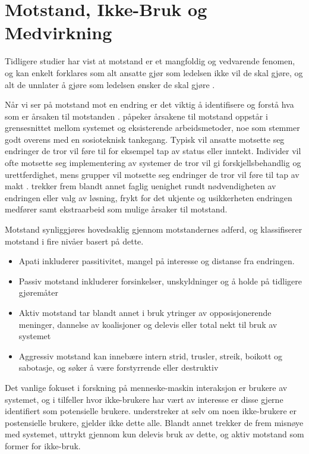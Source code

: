 \section{Motstand, Ikke-Bruk og Medvirkning}
\label{sec:motstand}

Tidligere studier har vist at motstand er et mangfoldig og vedvarende fenomen, og kan enkelt forklares som alt ansatte gjør som ledelsen ikke vil de skal gjøre, og alt de unnlater å gjøre som ledelsen ønsker de skal gjøre \citep{Timmons03}. 

\noindent
Når vi ser på motstand mot en endring er det viktig å identifisere og forstå hva som er årsaken til motstanden \citep{Lapointe05}. \citet{Timmons03} påpeker årsakene til motstand oppstår i grensesnittet mellom systemet og eksisterende arbeidsmetoder, noe som stemmer godt overens med en sosioteknisk tankegang. Typisk vil ansatte motsette seg endringer de tror vil føre til for eksempel tap av status eller inntekt. Individer vil ofte motsette seg implementering av systemer de tror vil gi forskjellsbehandlig og urettferdighet, mens grupper vil motsette seg endringer de tror vil føre til tap av makt \citep{Lapointe05}. \citet{Jacobsen12} trekker frem blandt annet faglig uenighet rundt nødvendigheten av endringen eller valg av løsning, frykt for det ukjente og usikkerheten endringen medfører samt ekstraarbeid som mulige årsaker til motstand.

\noindent
Motstand synliggjøres hovedsaklig gjennom motstandernes adferd, og \citep{Lapointe05} klassifiserer motstand i fire nivåer basert på dette.

\begin{itemize}
\item Apati inkluderer passitivitet, mangel på interesse og distanse fra endringen.
\item Passiv motstand inkluderer forsinkelser, unskyldninger og å holde på tidligere gjøremåter
\item Aktiv motstand tar blandt annet i bruk ytringer av opposisjonerende meninger, dannelse av koalisjoner og delevis eller total nekt til bruk av systemet
\item Aggressiv motstand kan innebære intern strid, trusler, streik, boikott og sabotasje, og søker å være forstyrrende eller destruktiv
\end{itemize}

\noindent
Det vanlige fokuset i forskning på menneske-maskin interaksjon er brukere av systemet, og i tilfeller hvor ikke-brukere har vært av interesse er disse gjerne identifiert som potensielle brukere. 
\citet{Satchell09} understreker at selv om noen ikke-brukere er postensielle brukere, gjelder ikke dette alle. Blandt annet trekker de frem misnøye med systemet, uttrykt gjennom kun delevis bruk av dette, og aktiv motstand som former for ikke-bruk.

